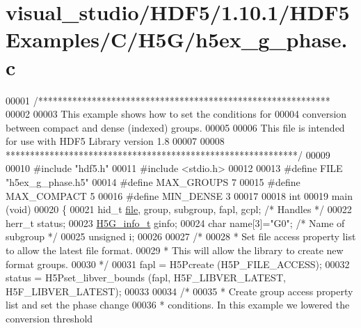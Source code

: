\hypertarget{visual__studio_2_h_d_f5_21_810_81_2_h_d_f5_examples_2_c_2_h5_g_2h5ex__g__phase_8c_source}{}\section{visual\+\_\+studio/\+H\+D\+F5/1.10.1/\+H\+D\+F5\+Examples/\+C/\+H5\+G/h5ex\+\_\+g\+\_\+phase.c}
\label{visual__studio_2_h_d_f5_21_810_81_2_h_d_f5_examples_2_c_2_h5_g_2h5ex__g__phase_8c_source}

\begin{DoxyCode}
00001 \textcolor{comment}{/************************************************************}
00002 \textcolor{comment}{}
00003 \textcolor{comment}{  This example shows how to set the conditions for}
00004 \textcolor{comment}{  conversion between compact and dense (indexed) groups.}
00005 \textcolor{comment}{}
00006 \textcolor{comment}{  This file is intended for use with HDF5 Library version 1.8}
00007 \textcolor{comment}{}
00008 \textcolor{comment}{ ************************************************************/}
00009 
00010 \textcolor{preprocessor}{#include "hdf5.h"}
00011 \textcolor{preprocessor}{#include <stdio.h>}
00012 
00013 \textcolor{preprocessor}{#define FILE        "h5ex\_g\_phase.h5"}
00014 \textcolor{preprocessor}{#define MAX\_GROUPS  7}
00015 \textcolor{preprocessor}{#define MAX\_COMPACT 5}
00016 \textcolor{preprocessor}{#define MIN\_DENSE   3}
00017 
00018 \textcolor{keywordtype}{int}
00019 main (\textcolor{keywordtype}{void})
00020 \{
00021     hid\_t       \hyperlink{structfile}{file}, group, subgroup, fapl, gcpl;      \textcolor{comment}{/* Handles */}
00022     herr\_t      status;
00023     \hyperlink{struct_h5_g__info__t}{H5G\_info\_t}  ginfo;
00024     \textcolor{keywordtype}{char}        name[3]=\textcolor{stringliteral}{"G0"};                  \textcolor{comment}{/* Name of subgroup */}
00025     \textcolor{keywordtype}{unsigned}    i;
00026 
00027     \textcolor{comment}{/*}
00028 \textcolor{comment}{     * Set file access property list to allow the latest file format.}
00029 \textcolor{comment}{     * This will allow the library to create new format groups.}
00030 \textcolor{comment}{     */}
00031     fapl = H5Pcreate (H5P\_FILE\_ACCESS);
00032     status = H5Pset\_libver\_bounds (fapl, H5F\_LIBVER\_LATEST, H5F\_LIBVER\_LATEST);
00033 
00034     \textcolor{comment}{/*}
00035 \textcolor{comment}{     * Create group access property list and set the phase change}
00036 \textcolor{comment}{     * conditions.  In this example we lowered the conversion threshold}

\end{DoxyCode}
